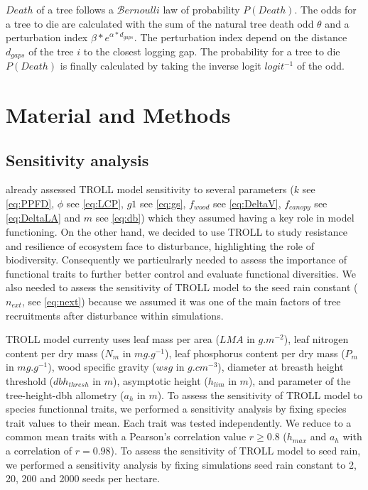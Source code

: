 \documentclass[12pt,]{article}
\let\oldsection\section
\renewcommand\section{\newpage\oldsection}
\theoremstyle{definition}
\theoremstyle{definition}
\theoremstyle{remark}
\begin{document}
\(Death\) of a tree follows a \(\mathcal{B}ernoulli\) law of probability
\(P(Death)\). The odds for a tree to die are calculated with the sum of
the natural tree death odd \(\theta\) and a perturbation index
\(\beta*e^{\alpha*d_{gaps}}\). The perturbation index depend on the
distance \(d_{gaps}\) of the tree \(i\) to the closest logging gap. The
probability for a tree to die \(P(Death)\) is finally calculated by
taking the inverse logit \(logit^{-1}\) of the odd.

\section{Material and Methods}\label{material-and-methods}

\subsection{Sensitivity analysis}\label{sensitivity-analysis}

\citet{Li} already assessed TROLL model sensitivity to several
parameters (\(k\) see \eqref{eq:PPFD}, \(\phi\) see \eqref{eq:LCP}, \(g1\)
see \eqref{eq:gs}, \(f_{wood}\) see \eqref{eq:DeltaV}, \(f_{canopy}\) see
\eqref{eq:DeltaLA} and \(m\) see \eqref{eq:db}) which they assumed having a
key role in model functioning. On the other hand, we decided to use
TROLL to study resistance and resilience of ecosystem face to
disturbance, highlighting the role of biodiversity. Consequently we
particulrarly needed to assess the importance of functional traits to
further better control and evaluate functional diversities. We also
needed to assess the sensitivity of TROLL model to the seed rain
constant (\(n_{ext}\), see \eqref{eq:next}) because we assumed it was one
of the main factors of tree recruitments after disturbance within
simulations.

TROLL model currenty uses leaf mass per area (\(LMA\) in \(g.m^{-2}\)),
leaf nitrogen content per dry mass (\(N_m\) in \(mg.g^{-1}\)), leaf
phosphorus content per dry mass (\(P_m\) in \(mg.g^{-1}\)), wood
specific gravity (\(wsg\) in \(g.cm^{-3}\)), diameter at breasth height
threshold (\(dbh_{thresh}\) in \(m\)), asymptotic height (\(h_{lim}\) in
\(m\)), and parameter of the tree-height-dbh allometry (\(a_h\) in
\(m\)). To assess the sensitivity of TROLL model to species functionnal
traits, we performed a sensitivity analysis by fixing species trait
values to their mean. Each trait was tested independently. We reduce to
a common mean traits with a Pearson's correlation value \(r \geq 0.8\)
(\(h_{max}\) and \(a_h\) with a correlation of \(r=0.98\)). To assess
the sensitivity of TROLL model to seed rain, we performed a sensitivity
analysis by fixing simulations seed rain constant to 2, 20, 200 and 2000
seeds per hectare.
\end{document}
